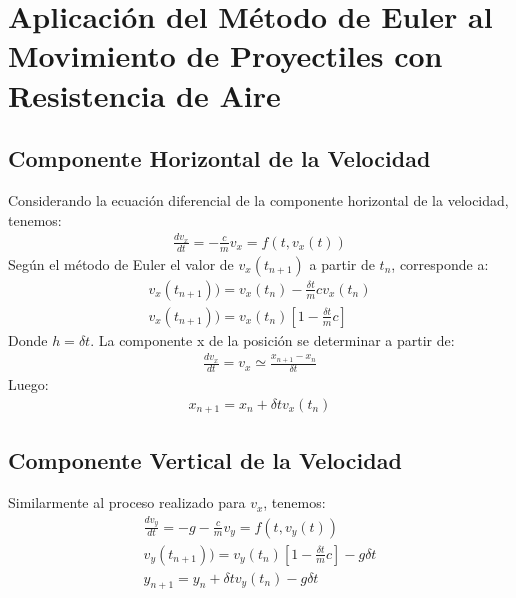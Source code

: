 \documentclass[12pt,a4paper,twoside]{article}
\begin{document}
\section{Aplicación del Método de Euler al Movimiento de Proyectiles con Resistencia de Aire}
\subsection{Componente Horizontal de la Velocidad}
Considerando la ecuación diferencial de la componente horizontal de la velocidad, tenemos:
\begin{eqnarray}
\frac{dv_{x}}{dt}=-\frac{c}{m}v_{x}=f(t,v_{x}(t))
\end{eqnarray}
Según el método de Euler el valor de $v_{x}(t_{n+1})$ a partir de $t_{n}$, corresponde a:
\begin{eqnarray}
v_{x}(t_{n+1}))=v_{x}(t_{n})-\frac{\delta t}{m}cv_{x}(t_{n})\nonumber\\
v_{x}(t_{n+1}))=v_{x}(t_{n})[1-\frac{\delta t}{m}c]
\end{eqnarray}
Donde $h=\delta t$. La componente x de la posición se determinar a partir de:
\begin{eqnarray}
\frac{dv_{x}}{dt}=v_{x}\simeq \frac{x_{n+1}-x_{n}}{\delta t}
\end{eqnarray}
Luego:
\begin{eqnarray}
x_{n+1}=x_{n}+{\delta t}v_{x}(t_{n})
\end{eqnarray}
\subsection{Componente Vertical de la Velocidad}
Similarmente al proceso realizado para $v_{x}$, tenemos:
\begin{eqnarray}
\frac{dv_{y}}{dt}=-g-\frac{c}{m}v_{y}=f(t,v_{y}(t))\\
v_{y}(t_{n+1}))=v_{y}(t_{n})[1-\frac{\delta t}{m}c]-g\delta t\\
y_{n+1}=y_{n}+{\delta t}v_{y}(t_{n})-g\delta t
\end{eqnarray}
\end{document}
